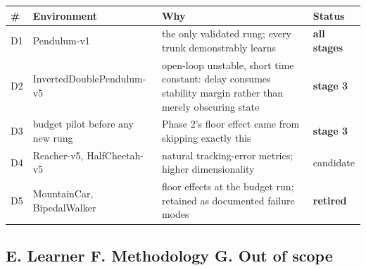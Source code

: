 \documentclass[11pt]{article}
\begin{document}
\begin{center}\footnotesize
\begin{tabular}{@{}lp{}p{}p{}@{}}
\toprule
\textbf{\#} & \textbf{Environment} & \textbf{Why} & \textbf{Status} \\
\midrule
D1 & Pendulum-v1 & the only validated rung; every trunk demonstrably learns & \textbf{all stages} \\
D2 & InvertedDoublePendulum-v5 & open-loop unstable, short time constant: delay consumes stability margin rather than merely obscuring state & \textbf{stage 3} \\
D3 & budget pilot before any new rung & Phase 2's floor effect came from skipping exactly this & \textbf{stage 3} \\
D4 & Reacher-v5, HalfCheetah-v5 & natural tracking-error metrics; higher dimensionality & candidate \\
D5 & MountainCar, BipedalWalker & floor effects at the budget run; retained as documented failure modes & \textbf{retired} \\
\bottomrule
\end{tabular}
\end{center}

\subsection{E. Learner \quad F. Methodology \quad G. Out of scope}
\end{document}
